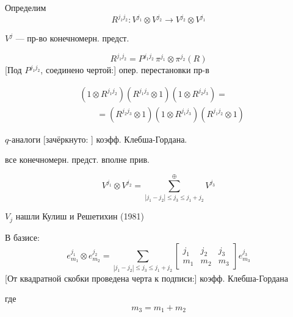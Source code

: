 
Определим
\begin{equation*}
R^{j_1j_2}\colon V^{j_1}\otimes V^{j_2}\longrightarrow V^{j_2}\otimes V^{j_1}
\end{equation*}

$V^j$ — пр-во конечномерн. предст.

\begin{equation*}
R^{j_1j_2}=P^{j_1j_2}\,\pi^{j_1}\otimes\pi^{j_2}(R)
\tag{13}
\end{equation*}
[Под $P^{j_1j_2}$, соединено чертой:] опер. перестановки пр-в

\begin{equation*}
\begin{aligned}
&(1\otimes R^{j_1j_2})(R^{j_1j_3}\otimes1)(1\otimes R^{j_2j_3})=\\
&\qquad=(R^{j_2j_3}\otimes1)(1\otimes R^{j_1j_3})(R^{j_1j_2}\otimes1)
\end{aligned}
\tag{14}
\end{equation*}

$q$-аналоги [зачёркнуто: ] коэфф. Клебша-Гордана.

все конечномерн. предст. вполне прив.

\begin{equation*}
V^{j_1}\otimes V^{j_2}=\sum_{|j_1-j_2|\le j_3\le j_1+j_2}^{\oplus}V^{j_3}
\tag{15}
\end{equation*}

$V_j$ нашли Кулиш и Решетихин (1981)

В базисе:
\begin{equation*}
e_{m_1}^{j_1}\otimes e_{m_2}^{j_2}=
\sum_{|j_1-j_2|\le j_3\le j_1+j_2}
\begin{bmatrix}
j_1&j_2&j_3\\
m_1&m_2&m_3
\end{bmatrix}e_{m_3}^{j_3}
\tag{16}
\end{equation*}
[От квадратной скобки проведена черта к подписи:] коэфф. Клебша-Гордана

где
\begin{equation*}
m_3=m_1+m_2
\end{equation*}

